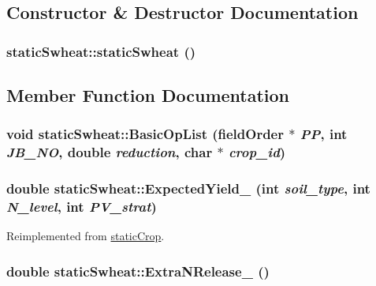 \subsection{Constructor \& Destructor Documentation}
\hypertarget{classstatic_swheat_a0e6a99c43e76c8078bf6b7bd1940c1a5}{
\subsubsection[{staticSwheat}]{\setlength{\rightskip}{0pt plus 5cm}staticSwheat::staticSwheat ()}}
\label{classstatic_swheat_a0e6a99c43e76c8078bf6b7bd1940c1a5}


\subsection{Member Function Documentation}
\hypertarget{classstatic_swheat_aad981adf4c091acdedbb1b0025502f96}{
\subsubsection[{BasicOpList}]{\setlength{\rightskip}{0pt plus 5cm}void staticSwheat::BasicOpList ({\bf fieldOrder} $\ast$ {\em PP}, \/  int {\em JB\_\-NO}, \/  double {\em reduction}, \/  char $\ast$ {\em crop\_\-id})}}
\label{classstatic_swheat_aad981adf4c091acdedbb1b0025502f96}
\hypertarget{classstatic_swheat_a7d5411d6ee08e7fbada0e6a1b2ea2971}{
\subsubsection[{ExpectedYield\_\-}]{\setlength{\rightskip}{0pt plus 5cm}double staticSwheat::ExpectedYield\_\- (int {\em soil\_\-type}, \/  int {\em N\_\-level}, \/  int {\em PV\_\-strat})}}
\label{classstatic_swheat_a7d5411d6ee08e7fbada0e6a1b2ea2971}


Reimplemented from \hyperlink{classstatic_crop_ab7b9a8ecb31b10c4dcf44f13000e2f8c}{staticCrop}.\hypertarget{classstatic_swheat_a3aca2b91246f9dfac75822518a37f705}{
\subsubsection[{ExtraNRelease\_\-}]{\setlength{\rightskip}{0pt plus 5cm}double staticSwheat::ExtraNRelease\_\- ()}}
\label{classstatic_swheat_a3aca2b91246f9dfac75822518a37f705}


